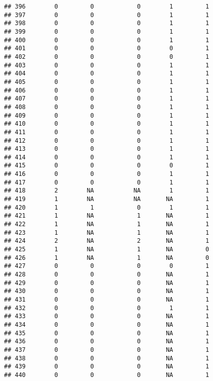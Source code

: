 \documentclass[
]{article}
\begin{document}
\begin{verbatim}
## 396        0         0            0        1         1
## 397        0         0            0        1         1
## 398        0         0            0        1         1
## 399        0         0            0        1         1
## 400        0         0            0        1         1
## 401        0         0            0        0         1
## 402        0         0            0        0         1
## 403        0         0            0        1         1
## 404        0         0            0        1         1
## 405        0         0            0        1         1
## 406        0         0            0        1         1
## 407        0         0            0        1         1
## 408        0         0            0        1         1
## 409        0         0            0        1         1
## 410        0         0            0        1         1
## 411        0         0            0        1         1
## 412        0         0            0        1         1
## 413        0         0            0        1         1
## 414        0         0            0        1         1
## 415        0         0            0        0         1
## 416        0         0            0        1         1
## 417        0         0            0        1         1
## 418        2        NA           NA        1         1
## 419        1        NA           NA       NA         1
## 420        1         1            0        1         1
## 421        1        NA            1       NA         1
## 422        1        NA            1       NA         1
## 423        1        NA            1       NA         1
## 424        2        NA            2       NA         1
## 425        1        NA            1       NA         0
## 426        1        NA            1       NA         0
## 427        0         0            0        0         1
## 428        0         0            0       NA         1
## 429        0         0            0       NA         1
## 430        0         0            0       NA         1
## 431        0         0            0       NA         1
## 432        0         0            0        1         1
## 433        0         0            0       NA         1
## 434        0         0            0       NA         1
## 435        0         0            0       NA         1
## 436        0         0            0       NA         1
## 437        0         0            0       NA         1
## 438        0         0            0       NA         1
## 439        0         0            0       NA         1
## 440        0         0            0       NA         1

\end{verbatim}
\end{document}
